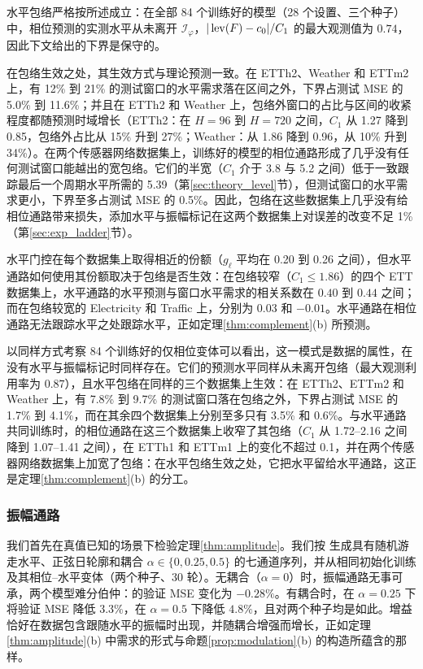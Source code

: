 {水平包络严格按所述成立：在全部 84 个训练好的模型（28 个设置、三个种子）中，相位预测的实测水平从未离开 $\mathcal I_\varphi$，$|\operatorname{lev}(F)-c_0|/C_1$ 的最大观测值为 $0.74$，因此下文给出的下界是保守的。

在包络生效之处，其生效方式与理论预测一致。在 ETTh2、Weather 和 ETTm2 上，有 12\% 到 21\% 的测试窗口的水平需求落在区间之外，下界占测试 MSE 的 5.0\% 到 11.6\%；并且在 ETTh2 和 Weather 上，包络外窗口的占比与区间的收紧程度都随预测时域增长（ETTh2：在 $H=96$ 到 $H=720$ 之间，$C_1$ 从 1.27 降到 0.85，包络外占比从 15\% 升到 27\%；Weather：从 1.86 降到 0.96，从 10\% 升到 34\%）。在两个传感器网络数据集上，训练好的模型的相位通路形成了几乎没有任何测试窗口能越出的宽包络。它们的半宽（$C_1$ 介于 3.8 与 5.2 之间）低于一致跟踪最后一个周期水平所需的 5.39（第\ref{sec:theory_level}节），但测试窗口的水平需求更小，下界至多占测试 MSE 的 0.5\%。因此，包络在这些数据集上几乎没有给相位通路带来损失，添加水平与振幅标记在这两个数据集上对误差的改变不足 1\%（第\ref{sec:exp_ladder}节）。

水平门控在每个数据集上取得相近的份额（$g_\ell$ 平均在 0.20 到 0.26 之间），但水平通路如何使用其份额取决于包络是否生效：在包络较窄（$C_1\le1.86$）的四个 ETT 数据集上，水平通路的水平预测与窗口水平需求的相关系数在 $0.40$ 到 $0.44$ 之间；而在包络较宽的 Electricity 和 Traffic 上，分别为 $0.03$ 和 $-0.01$。水平通路在相位通路无法跟踪水平之处跟踪水平，正如定理\ref{thm:complement}(b) 所预测。

以同样方式考察 84 个训练好的仅相位变体可以看出，这一模式是数据的属性，在没有水平与振幅标记时同样存在。它们的预测水平同样从未离开包络（最大观测利用率为 $0.87$），且水平包络在同样的三个数据集上生效：在 ETTh2、ETTm2 和 Weather 上，有 7.8\% 到 9.7\% 的测试窗口落在包络之外，下界占测试 MSE 的 1.7\% 到 4.1\%，而在其余四个数据集上分别至多只有 3.5\% 和 0.6\%。与水平通路共同训练时，\sysplus 的相位通路在这三个数据集上收窄了其包络（$C_1$ 从 1.72--2.16 之间降到 1.07--1.41 之间），在 ETTh1 和 ETTm1 上的变化不超过 0.1，并在两个传感器网络数据集上加宽了包络：在水平包络生效之处，它把水平留给水平通路，这正是定理\ref{thm:complement}(b) 的分工。

\subsubsection{振幅通路}
\label{sec:exp_mechanism}

我们首先在真值已知的场景下检验定理\ref{thm:amplitude}。我们按  生成具有随机游走水平、正弦日轮廓和耦合 $\alpha\in\{0,0.25,0.5\}$ 的七通道序列，并从相同初始化训练 \sysplus 及其相位–水平变体（两个种子、30 轮）。无耦合（$\alpha=0$）时，振幅通路无事可承，两个模型难分伯仲：\sysplus 的验证 MSE 变化为 $-0.28\%$。有耦合时，\sysplus 在 $\alpha=0.25$ 下将验证 MSE 降低 $3.3\%$，在 $\alpha=0.5$ 下降低 $4.8\%$，且对两个种子均是如此。增益恰好在数据包含跟随水平的振幅时出现，并随耦合增强而增长，正如定理\ref{thm:amplitude}(b) 中需求的形式与命题\ref{prop:modulation}(b) 的构造所蕴含的那样。

}
